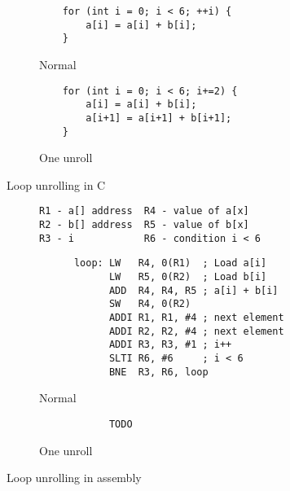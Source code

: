 \begin{figure}
    \centering
    \begin{subfigure}{.5\textwidth}
        \centering
        \begin{verbatim}
    for (int i = 0; i < 6; ++i) {
        a[i] = a[i] + b[i];
    }

        \end{verbatim}
        \caption{Normal}
        \label{fig:c:unroll:normal}
    \end{subfigure}%
    \begin{subfigure}{.5\textwidth}
        \centering
        \begin{verbatim}
    for (int i = 0; i < 6; i+=2) {
        a[i] = a[i] + b[i];
        a[i+1] = a[i+1] + b[i+1];
    }
        \end{verbatim}
        \caption{One unroll}
        \label{fig:c:unroll:unroll}
    \end{subfigure}
    \caption{Loop unrolling in C}
    \label{fig:c:unroll}
\end{figure}


\begin{figure}
    \centering
    \begin{subfigure}{6cm}
        \centering
        \begin{verbatim}
R1 - a[] address  R4 - value of a[x]
R2 - b[] address  R5 - value of b[x]
R3 - i            R6 - condition i < 6
        \end{verbatim}
    \end{subfigure}
    \begin{subfigure}{.5\textwidth}
        \centering
        \begin{verbatim}
      loop: LW   R4, 0(R1)  ; Load a[i]
            LW   R5, 0(R2)  ; Load b[i]
            ADD  R4, R4, R5 ; a[i] + b[i]
            SW   R4, 0(R2)
            ADDI R1, R1, #4 ; next element
            ADDI R2, R2, #4 ; next element
            ADDI R3, R3, #1 ; i++
            SLTI R6, #6     ; i < 6
            BNE  R3, R6, loop
        \end{verbatim}
        \caption{Normal}
        \label{fig:sub1}
    \end{subfigure}%
    \begin{subfigure}{.5\textwidth}
        \centering
        \begin{verbatim}
            TODO
        \end{verbatim}
        \caption{One unroll}
        \label{fig:sub2}
    \end{subfigure}
    \caption{Loop unrolling in assembly}
    \label{fig:assembly:unroll}
\end{figure}

